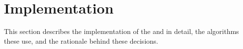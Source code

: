 \section{Implementation} \label{sect:case-study:impl}

This section describes the implementation of the \mlblinkui and \mlblinkapi in detail, the algorithms these use, and the rationale behind these decisions.